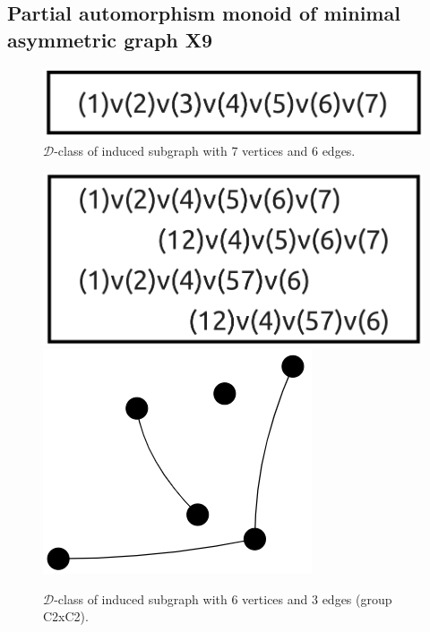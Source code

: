 \begin{appendices}
\section{Partial automorphism monoid of minimal asymmetric graph X9}

\begin{figure}[H]
\includegraphics[scale=0.1]{images/x9/x9_7v_6e.png}
\caption{$\mathcal{D}$-class of induced subgraph with 7 vertices and 6 edges.}
\end{figure}

\begin{figure}[H]
\includegraphics[scale=0.1]{images/x9/x9_6v_3e.png}
\includegraphics[scale=0.15]{images/x9/x9_6v_3e_vis.png}
\caption{$\mathcal{D}$-class of induced subgraph with 6 vertices and 3 edges (group C2xC2).}
\end{figure}


\end{appendices}
